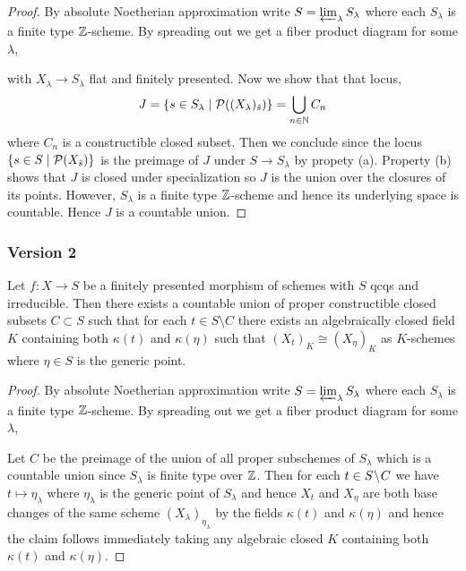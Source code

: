 \documentclass[12pt]{article}
\begin{document}
\begin{proof}
By absolute Noetherian approximation write $S = \operatorname*{\varprojlim}_\lambda S_\lambda$ where each $S_\lambda$ is a finite type $\mathbb{Z}$-scheme. By spreading out we get a fiber product diagram for some $\lambda$,
\begin{center}
\end{center}
with $X_\lambda \to S_\lambda$ flat and finitely presented. Now we show that that locus,
\[ J = \{ s \in S_\lambda \mid \mathcal{P}( (X_\lambda)_{\bar{s}}) \} = \bigcup_{n \in \mathbb{N}} C_n \]
where $C_n$ is a constructible closed subset. Then we conclude since the locus $\{ s \in S \mid \mathcal{P}(X_{\bar{s}}) \}$ is the preimage of $J$ under $S \to S_\lambda$ by propety (a). Property (b) shows that $J$ is closed under specialization so $J$ is the union over the closures of its points. However, $S_{\lambda}$ is a finite type $\mathbb{Z}$-scheme and hence its underlying space is countable. Hence $J$ is a countable union.
\end{proof}


\subsubsection{Version 2}

\begin{prop}
Let $f : X \to S$ be a finitely presented morphism of schemes with $S$ qcqs and irreducible. Then there exists a countable union of proper constructible closed subsets $C \subset S$ such that for each $t \in S \setminus C$ there exists an algebraically closed field $K$ containing both $\kappa(t)$ and $\kappa(\eta)$ such that $(X_t)_K \cong (X_\eta)_K$ as $K$-schemes where $\eta \in S$ is the generic point.
\end{prop}

\begin{proof}
By absolute Noetherian approximation write $S = \operatorname*{\varprojlim}_\lambda S_\lambda$ where each $S_\lambda$ is a finite type $\mathbb{Z}$-scheme. By spreading out we get a fiber product diagram for some $\lambda$,
\begin{center}
\end{center}
Let $C$ be the preimage of the union of all proper subschemes of $S_\lambda$ which is a countable union since $S_\lambda$ is finite type over $\mathbb{Z}$. Then for each $t \in S \! \setminus \! C$ we have $t \mapsto \eta_\lambda$ where $\eta_\lambda$ is the generic point of $S_\lambda$ and hence $X_t$ and $X_\eta$ are both base changes of the same scheme $(X_\lambda)_{\eta_\lambda}$ by the fields $\kappa(t)$ and $\kappa(\eta)$ and hence the claim follows immediately taking any algebraic closed $K$ containing both $\kappa(t)$ and $\kappa(\eta)$. 
\end{proof}
\end{document}
